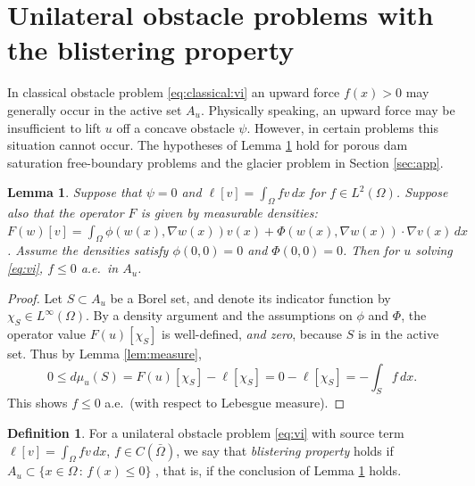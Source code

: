 \documentclass[]{interact}
\theoremstyle{plain}%
\newtheorem{lemma}[theorem]{Lemma}
\theoremstyle{definition}
\newtheorem{definition}[theorem]{Definition}
\theoremstyle{remark}
\newcommand{\grad}{\nabla}
\begin{document}




\appendix
\section{Unilateral obstacle problems with the blistering property} \label{app:blistering}

In classical obstacle problem \eqref{eq:classical:vi} an upward force $f(x)>0$ may generally occur in the active set $A_u$.  Physically speaking, an upward force may be insufficient to lift $u$ off a concave obstacle $\psi$.  However, in certain problems this situation cannot occur.  The hypotheses of Lemma \ref{lem:blister} hold for porous dam saturation free-boundary problems \cite[for example]{AinsworthOdenLee1993} and the glacier problem in Section \ref{sec:app}.

\begin{lemma} \label{lem:blister}
Suppose that $\psi=0$ and $\ell[v] = \int_\Omega fv\,dx$ for $f\in L^2(\Omega)$.  Suppose also that the operator $F$ is given by measurable densities: $F(w)[v]=\int_\Omega \phi(w(x),\grad w(x)) v(x) + \Phi(w(x),\grad w(x)) \cdot \grad v(x)\,dx$.  Assume the densities satisfy $\phi(0,0)=0$ and $\Phi(0,0)=0$.  Then for $u$ solving \eqref{eq:vi}, $f\le 0$ a.e.~in $A_u$.
\end{lemma}

\begin{proof}
Let $S\subset A_u$ be a Borel set, and denote its indicator function by $\chi_S \in L^\infty(\Omega)$.  By a density argument and the assumptions on $\phi$ and $\Phi$, the operator value $F(u)[\chi_S]$ is well-defined, \emph{and zero}, because $S$ is in the active set.  Thus by Lemma \ref{lem:measure},
\begin{equation*}
0 \le d\mu_u(S) = F(u)[\chi_S]-\ell[\chi_S] = 0 - \ell[\chi_S] = -\int_S f\,dx.
\end{equation*}
This shows $f\le 0$ a.e.~(with respect to Lebesgue measure).
\end{proof}

\begin{definition}
For a unilateral obstacle problem \eqref{eq:vi} with source term $\ell[v] = \int_\Omega fv\,dx$, $f\in C(\bar \Omega)$, we say that \emph{blistering property} holds if $A_u \subset \{x \in \Omega\, :\, f(x)\le 0\}$ \cite{JouvetBueler2012}, that is, if the conclusion of Lemma \ref{lem:blister} holds.
\end{definition}
\end{document}
